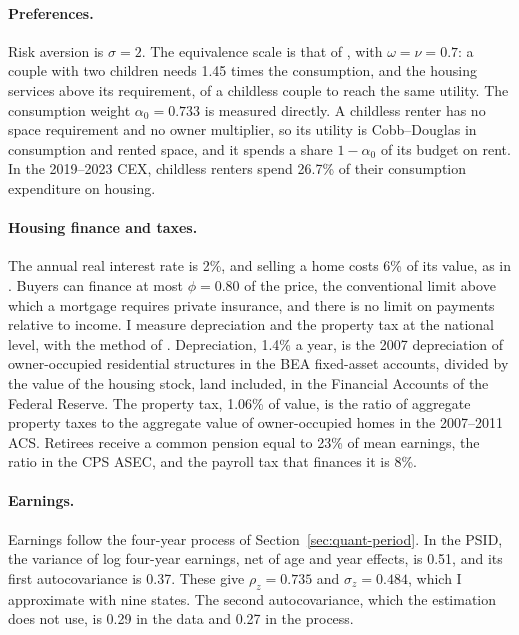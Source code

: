 \paragraph{Preferences.}
Risk aversion is $\sigma=2$. The equivalence scale is that of
\citet{scholzSeshadriKhitatrakunSaving2006}, with $\omega=\nu=0.7$: a couple
with two children needs 1.45 times the consumption, and the housing services
above its requirement, of a childless couple to reach the same utility. The
consumption weight $\alpha_0=0.733$ is measured directly. A childless renter
has no space requirement and no owner multiplier, so its utility is
Cobb--Douglas in consumption and rented space, and it spends a share
$1-\alpha_0$ of its budget on rent. In the 2019--2023 CEX, childless renters
spend 26.7\% of their consumption expenditure on housing.

\paragraph{Housing finance and taxes.}
The annual real interest rate is 2\%, and selling a home costs 6\% of its
value, as in \citet{greaneyDynamicUrbanEconomics2025}. Buyers can finance at
most $\phi=0.80$ of the price, the conventional limit above which a mortgage
requires private insurance, and there is no limit on payments relative to
income. I measure depreciation and the property tax at the national level,
with the method of \citet{greaneyDynamicUrbanEconomics2025}. Depreciation,
1.4\% a year, is the 2007 depreciation of owner-occupied residential
structures in the BEA fixed-asset accounts, divided by the value of the
housing stock, land included, in the Financial Accounts of the Federal
Reserve. The property tax, 1.06\% of value, is the ratio of aggregate
property taxes to the aggregate value of owner-occupied homes in the
2007--2011 ACS. Retirees receive a common pension equal to 23\% of mean
earnings, the ratio in the CPS ASEC, and the payroll tax that finances it is
8\%.

\paragraph{Earnings.}
Earnings follow the four-year process of Section~\ref{sec:quant-period}. In
the PSID, the variance of log four-year earnings, net of age and year
effects, is 0.51, and its first autocovariance is 0.37. These give
$\rho_z=0.735$ and $\sigma_z=0.484$, which I approximate with nine states.
The second autocovariance, which the estimation does not use, is 0.29 in the
data and 0.27 in the process.

